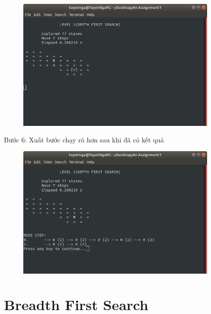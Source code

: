 \documentclass[a4paper]{article}
\begin{document}
\begin{center}
	\begin{figure}[htp]
		\begin{center}
			\includegraphics[width=10cm]{Images/depth5.png}
		\end{center}
		\caption{\label{fig:depth5}}
	\end{figure}
\end{center}
\begin{flushleft}
	\hspace{2 cm}	Bước 6: Xuất bước chạy rõ hơn sau khi đã có kết quả
\end{flushleft}
\begin{center}
	\begin{figure}[htp]
		\begin{center}
			\includegraphics[width=10cm]{Images/depth6.png}
		\end{center}
		\caption{\label{fig:depth6}}
	\end{figure}
\end{center}
\newpage

\section{Breadth First Search}
\end{document}

